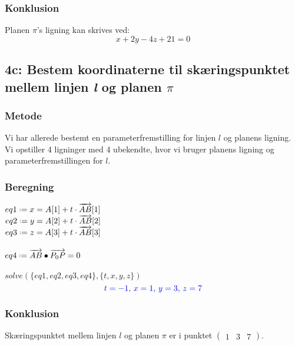 \documentclass[../main.tex]{subfiles}
\begin{document}
    \subsubsection*{Konklusion}
        Planen \(\pi\)'s ligning kan skrives ved:
        \[x+2y-4z+21=0\]
\clearpage
\subsection*{4c: Bestem koordinaterne til skæringspunktet mellem linjen \textit{l} og planen \(\pi\)}
    \subsubsection*{Metode}
        Vi har allerede bestemt en parameterfremstilling for linjen \(l\) og planens ligning.\\
        Vi opstiller 4 ligninger med 4 ubekendte, hvor vi bruger planens ligning og parameterfremstillingen for \(l\).
    \subsubsection*{Beregning}
        \(eq1 \defeq x=A[1]+t\cdot \overrightarrow{AB}[1]\)\\
        \(eq2 \defeq y=A[2]+t\cdot \overrightarrow{AB}[2]\)\\
        \(eq3 \defeq z=A[3]+t\cdot \overrightarrow{AB}[3]\)\\\\
        \( eq4 \defeq \overrightarrow{AB} \bullet \overrightarrow{P_0P}=0\)\\\\
        \(solve \left(\{eq1, eq2, eq3, eq4\},\{t,x,y,z\}\right)\)
        \[\textcolor{blue}{t=-1,\, x=1,\, y=3,\, z=7}\]
    \subsubsection*{Konklusion}
    Skæringspunktet mellem linjen \(l\) og planen \(\pi\) er i punktet \(\begin{pmatrix} 1 & 3 & 7 \end{pmatrix}\).
\end{document}
